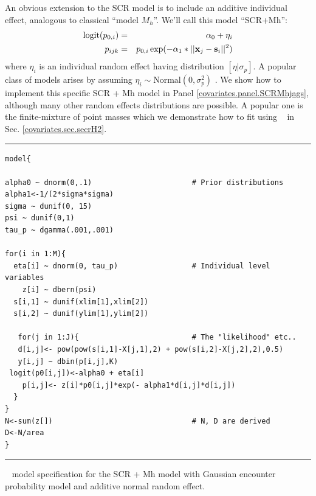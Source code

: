 An obvious extension to the SCR model is to include an additive
individual effect, analogous to classical ``model $M_{h}$''. We'll
call this model ``SCR+Mh'':
\begin{eqnarray*}
\mbox{logit}(p_{0,i})& =& \alpha_0 + \eta_{i} \\
p_{ijk}& = &p_{0,i} \exp(- \alpha_1*||{\bf x}_{j}-{\bf s}_{i}||^2)
\end{eqnarray*}
where $\eta_{i}$ is an individual random effect having distribution
$[\eta|\sigma_{p}]$.  A popular class of models arises by assuming
$\eta_{i} \sim \mbox{Normal}(0,\sigma_{p}^{2})$ \citep{coull_agresti:1999,
dorazio_royle:2003}. 
We show how to implement this specific SCR + Mh model in 
Panel \ref{covariates.panel.SCRMhjags}, although
many other random effects
distributions are possible. A popular one is the finite-mixture of
point masses
\citep{norris_pollock:1996, pledger:2000} which 
we demonstrate how to fit using \secr~ in
Sec. \ref{covariates.sec.secrH2}.  

\begin{panel}[htp]
\centering
\rule[0.1in]{\textwidth}{.03in}
{\small
\begin{verbatim}
model{

alpha0 ~ dnorm(0,.1)                       # Prior distributions
alpha1<-1/(2*sigma*sigma)
sigma ~ dunif(0, 15)
psi ~ dunif(0,1)
tau_p ~ dgamma(.001,.001)

for(i in 1:M){
  eta[i] ~ dnorm(0, tau_p)                 # Individual level variables
    z[i] ~ dbern(psi)
  s[i,1] ~ dunif(xlim[1],xlim[2])
  s[i,2] ~ dunif(ylim[1],ylim[2])

   for(j in 1:J){                          # The "likelihood" etc..
   d[i,j]<- pow(pow(s[i,1]-X[j,1],2) + pow(s[i,2]-X[j,2],2),0.5)
   y[i,j] ~ dbin(p[i,j],K)
 logit(p0[i,j])<-alpha0 + eta[i]
    p[i,j]<- z[i]*p0[i,j]*exp(- alpha1*d[i,j]*d[i,j])
  }
}
N<-sum(z[])                                # N, D are derived
D<-N/area
}

\end{verbatim}
}

\rule[-0.1in]{\textwidth}{.03in}
\caption{
\jags~ model specification for the SCR + Mh model with Gaussian
encounter 
probability model and additive normal random effect.
}
\label{covariates.panel.SCRMhjags}
\end{panel}




